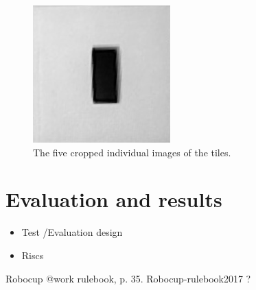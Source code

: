 \documentclass{article}
\begin{document}
\begin{figure}[h!]
\begin{minipage}{\textwidth}
\hspace{0.1cm}
\includegraphics[scale=0.3]{images/tile4.jpg}
\caption{The five cropped individual images of the tiles.}
\label{fig:individ}
\end{minipage}
\end{figure}


\section{Evaluation and results}

\begin{itemize}
\item Test /Evaluation design
\item Riscs
\end{itemize}

\begin{thebibliography}{99}
	 Robocup @work rulebook, p. 35. Robocup-rulebook2017
	 ? 
	\end{thebibliography}
\end{document}
